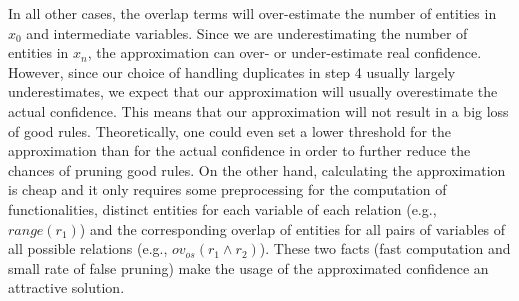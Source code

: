 {In all other cases, the overlap terms will over-estimate the number of entities in $x_0$ and intermediate variables. Since we are underestimating the number of
entities in $x_n$, the approximation can over- or under-estimate real confidence.
However, since our choice of handling duplicates in step 4 usually largely underestimates, we expect that our approximation will usually overestimate the actual confidence.
This means that our approximation will not result in a big loss of good rules.
 Theoretically, one could even set a lower threshold for the approximation than for the actual confidence in order to further reduce the chances of pruning good rules.
On the other hand, calculating the approximation is cheap and it only requires some preprocessing for the computation of functionalities, distinct entities for each variable of each relation (e.g., $range(r_1)$)
and the corresponding overlap of entities for all pairs of variables of all possible relations (e.g., $ov_{os}(r_1\wedge r_2)$).
These two facts (fast computation and small rate of false pruning) make the usage of the approximated confidence an attractive solution.
}


%

